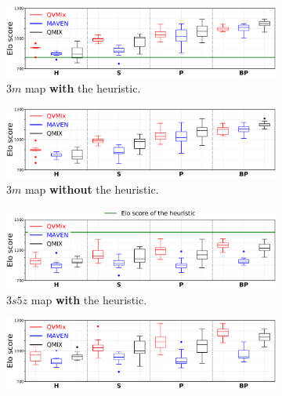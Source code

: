 \begin{figure}[ht]
\begin{subfigure}{\textwidth}
\centering
\includegraphics[width=.95\textwidth]{tex_thesis/figures/ch7/3m_tiny_all_h_clean.pdf}
\caption{$3m$ map \textbf{with} the heuristic.}
\label{subfig:3m_all_h}
\end{subfigure}
\begin{subfigure}{\textwidth}
\centering
\includegraphics[width=\textwidth]{tex_thesis/figures/ch7/3m_tiny_all_no_h_clean.pdf}
\caption{$3m$ map \textbf{without} the heuristic.}
\label{subfig:3m_all_no_h}
\end{subfigure}
\begin{subfigure}{\textwidth}
\centering
\includegraphics[width=.95\textwidth]{tex_thesis/figures/ch7/3s5z_tiny_all_h_clean.pdf}
\caption{$3s5z$ map \textbf{with} the heuristic.}
\label{subfig:3s5z_all_h}
\end{subfigure}
\begin{subfigure}{\textwidth}
\centering
\includegraphics[width=\textwidth]{tex_thesis/figures/ch7/3s5z_tiny_all_no_h_clean.pdf}

\end{subfigure}
\end{figure}
